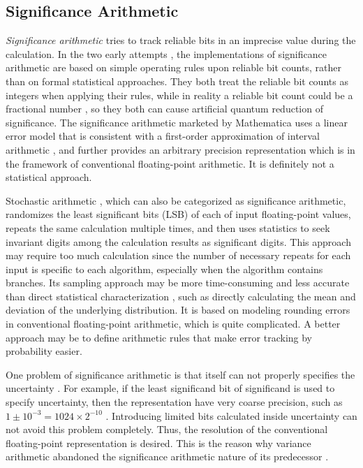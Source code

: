 \documentclass[twoside]{article}
\numberwithin{equation}{section}
\begin{document}
\subsection{Significance Arithmetic}

\emph{Significance arithmetic} \cite{Significance_Arithmetic} tries to track reliable bits in an imprecise value during the calculation.  
In the two early attempts \cite{Digital_Significance_Arithmetic}\cite{Unnormalized_Arithmetic}, the implementations of significance arithmetic are based on simple operating rules upon reliable bit counts, rather than on formal statistical approaches.  
They both treat the reliable bit counts as integers when applying their rules, while in reality a reliable bit count could be a fractional number \cite{Mathematica_Significance_Arithmetic}, so they both can cause artificial quantum reduction of significance.  
The significance arithmetic marketed by Mathematica \cite{Mathematica_Significance_Arithmetic} uses a linear error model that is consistent with a first-order approximation of interval arithmetic \cite{Precise_Numerical_Methods}\cite{Interval_Analysis_Theory_Applications}\cite{Interval_Arithmetic}, and further provides an arbitrary precision representation which is in the framework of  conventional floating-point arithmetic. 
It is definitely not a statistical approach. 

Stochastic arithmetic \cite{Stochastic_Arithmetic} \cite{CADNA_library}, which can also be categorized as significance arithmetic, randomizes the least significant bits (LSB) of each of input floating-point values, repeats the same calculation multiple times, and then uses statistics to seek invariant digits among the calculation results as significant digits.  
This approach may require too much calculation since the number of necessary repeats for each input is specific to each algorithm, especially when the algorithm contains branches.  
Its sampling approach may be more time-consuming and less accurate than direct statistical characterization \cite{Probability_Statistics}, such as directly calculating the mean and deviation of the underlying distribution.  
It is based on modeling rounding errors in conventional floating-point arithmetic, which is quite complicated.  
A better approach may be to define arithmetic rules that make error tracking by probability easier.

One problem of significance arithmetic is that itself can not properly specifies the uncertainty \cite{Prev_Precision_Arithmetic}.
For example, if the least significand bit of significand is used to specify uncertainty, then the representation have very coarse precision, such as $1 \pm 10^{-3} = 1024 \times 2^{-10}$  \cite{Prev_Precision_Arithmetic}.
Introducing limited bits calculated inside uncertainty can not avoid this problem completely.
Thus, the resolution of the conventional floating-point representation is desired.
This is the reason why variance arithmetic abandoned the significance arithmetic nature of its predecessor \cite{Prev_Precision_Arithmetic}.
\end{document}
